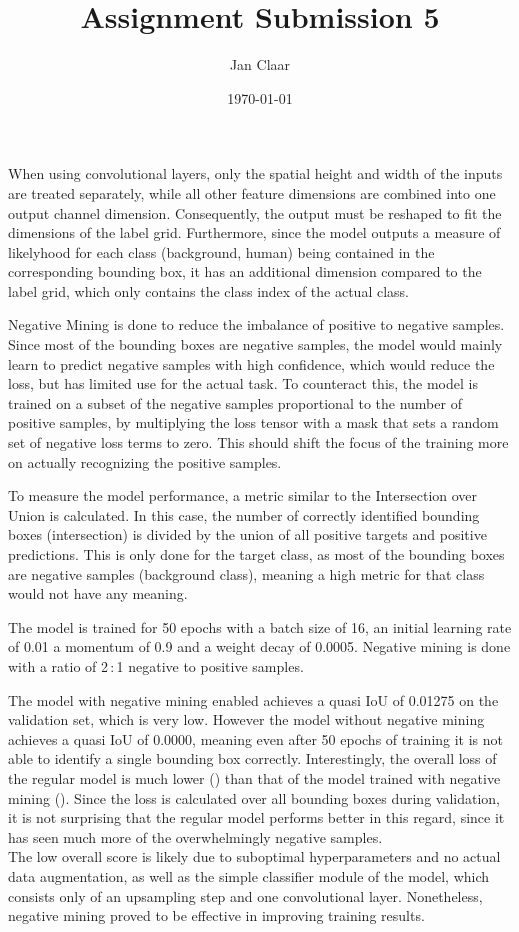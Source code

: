 \documentclass[
    headings=optiontohead,              %
    12pt,                               %
    DIV=13,                             %
    twoside=false,                      %
    open=right,                         %
    BCOR=00mm,                          %
    toc=bibliographynumbered,            %
    parskip=half,                       %
]{scrarticle}
\title{Assignment Submission 5}
\author{Jan Claar}
\date{\today}
\begin{document}
    \head 


    When using convolutional layers, only the spatial height and width of the inputs are treated separately, while all other feature dimensions are combined into one output channel dimension. Consequently, the output must be reshaped to fit the dimensions of the label grid. Furthermore, since the model outputs a measure of likelyhood for each class (background, human) being contained in the corresponding bounding box, it has an additional dimension compared to the label grid, which only contains the class index of the actual class. 
    

    Negative Mining is done to reduce the imbalance of positive to negative samples. Since most of the bounding boxes are negative samples, the model would mainly learn to predict negative samples with high confidence, which would reduce the loss, but has limited use for the actual task. To counteract this, the model is trained on a subset of the negative samples proportional to the number of positive samples, by multiplying the loss tensor with a mask that sets a random set of negative loss terms to zero. This should shift the focus of the training more on actually recognizing the positive samples. 

    To measure the model performance, a metric similar to the Intersection over Union is calculated. In this case, the number of correctly identified bounding boxes (intersection) is divided by the union of all positive targets and positive predictions. This is only done for the target class, as most of the bounding boxes are negative samples (background class), meaning a high metric for that class would not have any meaning.

    The model is trained for 50 epochs with a batch size of 16, an initial learning rate of 0.01 a momentum of 0.9 and a weight decay of 0.0005. Negative mining is done with a ratio of 2\,:\,1 negative to positive samples.

    The model with negative mining enabled achieves a quasi IoU of 0.01275 on the validation set, which is very low. However the model without negative mining achieves a quasi IoU of 0.0000, meaning even after 50 epochs of training it is not able to identify a single bounding box correctly. Interestingly, the overall loss of the regular model is much lower () than that of the model trained with negative mining (). Since the loss is calculated over all bounding boxes during validation, it is not surprising that the regular model performs better in this regard, since it has seen much more of the overwhelmingly negative samples. \\
    The low overall score is likely due to suboptimal hyperparameters and no actual data augmentation, as well as the simple classifier module of the model, which consists only of an upsampling step and one convolutional layer. Nonetheless, negative mining proved to be effective in improving training results.
\end{document}
